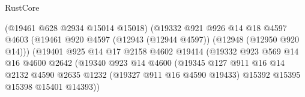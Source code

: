 \begin{lexlean}{RustCore}
\begin{coremodule}
                                            (@19461 @628 @2934 @15014 @15018)
                                            (@19332
                                              @921
                                              @926
                                              @14
                                              @18
                                              @4597
                                              @4603
                                              (@19461
                                                @920
                                                @4597
                                                (@12943 (@12944 @4597))
                                                (@12948 (@12950 @920 @14)))
                                              (@19401
                                                @925
                                                @14
                                                @17
                                                @2158
                                                @4602
                                                @19414
                                                (@19332
                                                  @923
                                                  @569
                                                  @14
                                                  @16
                                                  @4600
                                                  @2642
                                                  (@19340
                                                    @923
                                                    @14
                                                    @4600
                                                    (@19345
                                                      @127
                                                      @911
                                                      @16
                                                      @14
                                                      @2132
                                                      @4590
                                                      @2635
                                                      @1232
                                                      (@19327 @911 @16 @4590 @19433)
                                                      @15392
                                                      @15395
                                                      @15398
                                                      @15401
                                                      @14393))

\end{coremodule}
\end{lexlean}
